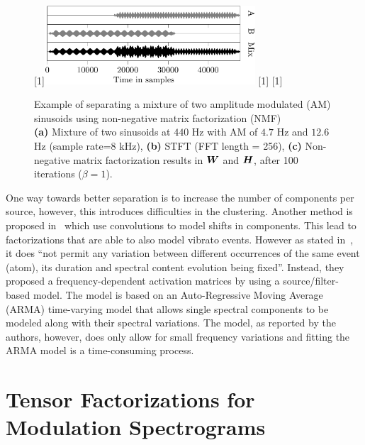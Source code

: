 \begin{figure}[H]
\centering
{}%
[1\textwidth]{\includegraphics[width=0.7\textwidth]{Chapters/05_Separation_Known/figures/Timepdf-crop.pdf}}%
\hspace{0.2\textwidth} %
[1\textwidth]{}%
\hspace{0.3\textwidth} %
[1\textwidth]{}%
\caption{Example of separating a mixture of two amplitude modulated (AM) sinusoids using non-negative matrix factorization (NMF)\\ \textbf{(a)} Mixture of two sinusoids at $440$ Hz with AM of $4.7$ Hz and $12.6$ Hz (sample rate=$8$ kHz), \textbf{(b)} STFT (FFT length = 256), \textbf{(c)} Non-negative matrix factorization results in ${\bm{W}}$ and ${\bm{H}}$, after 100 iterations ($\beta = 1$).}
\label{fig:am_tensor_nmf}
\end{figure}

One way towards better separation is to increase the number of components per source, however, this introduces difficulties in the clustering.
Another method is proposed in~\cite{smaragdis04, fitzgerald05s, jaiswal13, rodriguezserrano16} which use convolutions to model shifts in components.
This lead to factorizations that are able to also model vibrato events.
However as stated in~\cite{hennequin11}, it does ``not  permit  any variation  between  different  occurrences  of  the  same  event (atom), its duration and spectral content evolution being fixed''. 
Instead, they proposed a frequency-dependent activation matrices by using a source/filter-based model.
The model is based on an Auto-Regressive Moving Average (ARMA) time-varying model that allows single spectral components to be modeled along with their spectral variations. 
The model, as reported by the authors, however, does only allow for small frequency variations and fitting the ARMA model is a time-consuming process.

\section{Tensor Factorizations for Modulation Spectrograms}
\label{sub:am}

